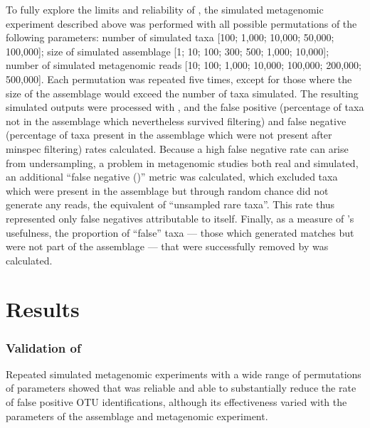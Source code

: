 To fully explore the limits and reliability of , the simulated metagenomic experiment described above was performed with all possible permutations of the following parameters: number of simulated taxa [100; 1,000; 10,000; 50,000; 100,000]; size of simulated assemblage [1; 10; 100; 300; 500; 1,000; 10,000]; number of simulated metagenomic reads [10; 100; 1,000; 10,000; 100,000; 200,000; 500,000].
Each permutation was repeated five times, except for those where the size of the assemblage would exceed the number of taxa simulated.
The resulting simulated  outputs were processed with , and the false positive (percentage of taxa not in the assemblage which nevertheless survived  filtering) and false negative (percentage of taxa present in the assemblage which were not present after minspec filtering) rates calculated.
Because a high false negative rate can arise from undersampling, a problem in metagenomic studies both real and simulated, an additional ``false negative ()'' metric was calculated, which excluded taxa which were present in the assemblage but through random chance did not generate any reads, the equivalent of ``unsampled rare taxa''.
This rate thus represented only false negatives attributable to  itself.
Finally, as a measure of 's usefulness, the proportion of ``false'' taxa --- those which generated  matches but were not part of the assemblage --- that were successfully removed by  was calculated.

\section{Results}

\subsubsection{Validation of }

Repeated simulated metagenomic experiments with a wide range of permutations of parameters showed that  was reliable and able to substantially reduce the rate of false positive \ac{OTU} identifications, although its effectiveness varied with the parameters of the assemblage and metagenomic experiment.



